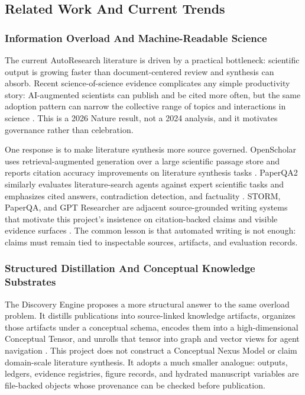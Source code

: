 \documentclass[
]{article}
\begin{document}
\subsection{Related Work And Current Trends}\label{sec:related-work}

\subsubsection{Information Overload And Machine-Readable
Science}\label{sec:information-overload-machine-readable-science}

The current AutoResearch literature is driven by a practical bottleneck:
scientific output is growing faster than document-centered review and
synthesis can absorb. Recent science-of-science evidence complicates any
simple productivity story: AI-augmented scientists can publish and be
cited more often, but the same adoption pattern can narrow the
collective range of topics and interactions in science
\citep{hao_ai_tools_focus_2026}. This is a 2026 Nature result, not a
2024 analysis, and it motivates governance rather than celebration.

One response is to make literature synthesis more source governed.
OpenScholar uses retrieval-augmented generation over a large scientific
passage store and reports citation accuracy improvements on literature
synthesis tasks \citep{asai_openscholar_2026}. PaperQA2 similarly
evaluates literature-search agents against expert scientific tasks and
emphasizes cited answers, contradiction detection, and factuality
\citep{skarlinski_paperqa2_2024}. STORM, PaperQA, and GPT Researcher are
adjacent source-grounded writing systems that motivate this project's
insistence on citation-backed claims and visible evidence surfaces
\citep{shao_storm_2024, lala_paperqa_2023, gpt_researcher_2026}. The
common lesson is that automated writing is not enough: claims must
remain tied to inspectable sources, artifacts, and evaluation records.

\subsubsection{Structured Distillation And Conceptual Knowledge
Substrates}\label{sec:structured-distillation-knowledge-substrates}

The Discovery Engine proposes a more structural answer to the same
overload problem. It distills publications into source-linked knowledge
artifacts, organizes those artifacts under a conceptual schema, encodes
them into a high-dimensional Conceptual Tensor, and unrolls that tensor
into graph and vector views for agent navigation
\citep{baulin_discovery_engine_2025}. This project does not construct a
Conceptual Nexus Model or claim domain-scale literature synthesis. It
adopts a much smaller analogue: outputs, ledgers, evidence registries,
figure records, and hydrated manuscript variables are file-backed
objects whose provenance can be checked before publication.
\end{document}
